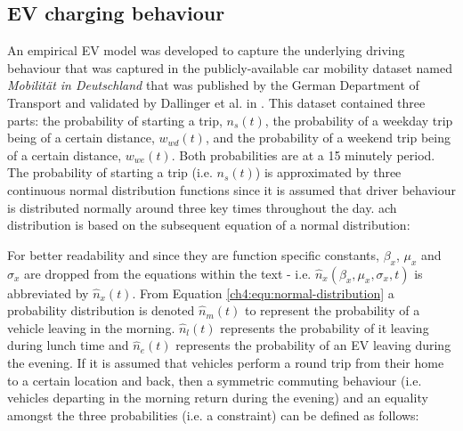 \subsection{EV charging behaviour}
\label{ch4:subsec:ev-charging-behaviour}


An empirical EV model was developed to capture the underlying driving behaviour that was captured in the publicly-available car mobility dataset named \textit{Mobilit\"{a}t in Deutschland} that was published by the German Department of Transport \cite{MiD2008} and validated by Dallinger et al. in \cite{Dallinger2012}.
This dataset contained three parts: the probability of starting a trip, $n_{s}(t)$, the probability of a weekday trip being of a certain distance, $w_{wd}(t)$, and the probability of a weekend trip being of a certain distance, $w_{we}(t)$.
Both probabilities are at a 15 minutely period.
The probability of starting a trip (i.e. $n_{s}(t)$) is approximated by three continuous normal distribution functions since it is assumed that driver behaviour is distributed normally around three key times throughout the day.
\cite{MiD2008}ach distribution is based on the subsequent equation of a normal distribution:



For better readability and since they are function specific constants, $\beta_x$, $\mu_x$ and $\sigma_x$ are dropped from the equations within the text - i.e. $\hat{n}_x(\beta_x,\mu_x,\sigma_x,t)$ is abbreviated by $\hat{n}_x(t)$.
From Equation \ref{ch4:equ:normal-distribution} a probability distribution is denoted $\hat{n}_{m}(t)$ to represent the probability of a vehicle leaving in the morning.
$\hat{n}_{l}(t)$ represents the probability of it leaving during lunch time and $\hat{n}_{e}(t)$ represents the probability of an EV leaving during the evening.
If it is assumed that vehicles perform a round trip from their home to a certain location and back, then a symmetric commuting behaviour (i.e. vehicles departing in the morning return during the evening) and an equality amongst the three probabilities (i.e. a constraint) can be defined as follows:

